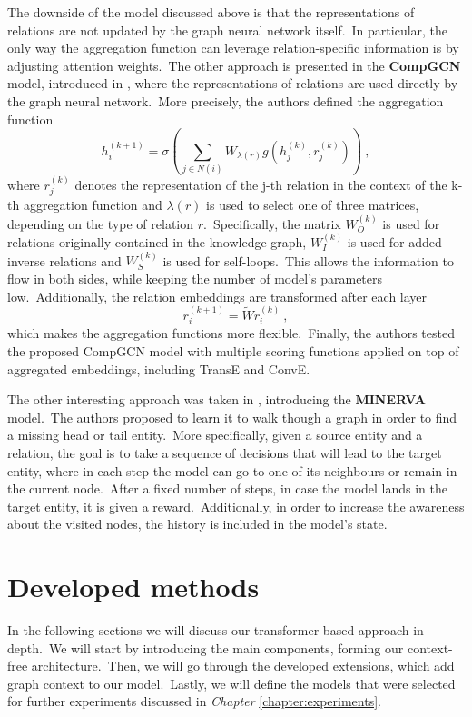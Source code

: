 \documentclass[longabstract, english, mgr]{iithesis}
\newcommand\numberedchapter[1]{\setlength\topskip{3cm}\chapter{#1}\setlength\topskip{0cm}}
\theoremstyle{default_theorem_style}\newtheorem{theorem}{Theorem}
\theoremstyle{default_theorem_style}\newtheorem{definition}{Definition}
\begin{document}
\noindent The downside of the model discussed above is that the representations of relations are not updated by the
graph neural network itself.\ In particular, the only way the aggregation function can leverage relation-specific
information is by adjusting attention weights.\ The other approach is presented in the \textbf{CompGCN} model,
introduced in \cite{comp_gcn_model}, where the representations of relations are used directly by the graph neural
network.\ More precisely, the authors defined the aggregation function
$$
h_i^{(k + 1)} = \sigma(\sum_{j \in N(i)} W_{\lambda(r)} g(h_j^{(k)}, r_j^{(k)}))\ ,
$$
where $r_j^{(k)}$ denotes the representation of the j-th relation in the context of the k-th aggregation function and
$\lambda(r)$ is used to select one of three matrices, depending on the type of relation $r$.\ Specifically, the
matrix $W_O^{(k)}$ is used for relations originally contained in the knowledge graph, $W_I^{(k)}$ is used for added
inverse relations and $W_S^{(k)}$ is used for self-loops.\ This allows the information to flow in both sides, while
keeping the number of model's parameters low.\ Additionally, the relation embeddings are transformed after each layer
$$
r_i^{(k + 1)} = \tilde{W} r_i^{(k)}\ ,
$$
which makes the aggregation functions more flexible.\ Finally, the authors tested the proposed CompGCN model with
multiple scoring functions applied on top of aggregated embeddings, including TransE and ConvE.\newline

\noindent The other interesting approach was taken in \cite{go_for_a_walk_model}, introducing the \textbf{MINERVA}
model.\ The authors proposed to learn it to walk though a graph in order to find a missing head or tail
entity.\ More specifically, given a source entity and a relation, the goal is to take a sequence of decisions that
will lead to the target entity, where in each step the model can go to one of its neighbours or remain in the current
node.\ After a fixed number of steps, in case the model lands in the target entity, it is given a reward.\ Additionally,
in order to increase the awareness about the visited nodes, the history is included in the model's state.


\numberedchapter{Developed methods}\label{chapter:developed_methods}

In the following sections we will discuss our transformer-based approach in depth.\ We will start by introducing the
main components, forming our context-free architecture.\ Then, we will go through the developed extensions, which
add graph context to our model.\ Lastly, we will define the models that were selected for further
experiments discussed in \textit{Chapter} \ref{chapter:experiments}.
\end{document}
